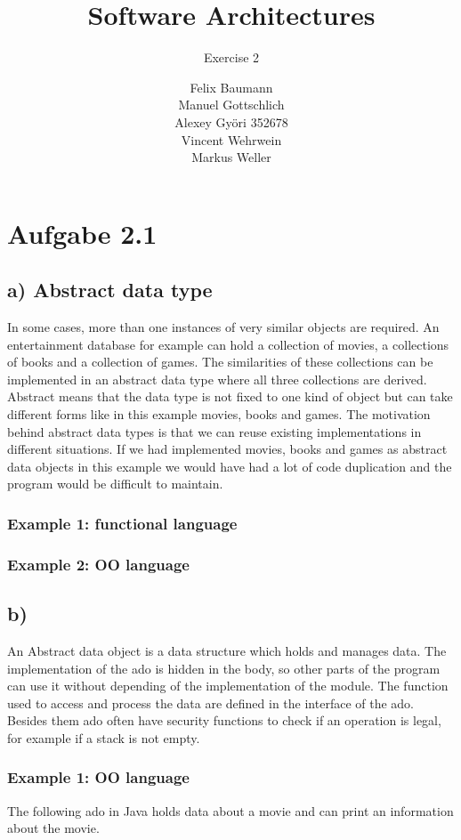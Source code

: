 \documentclass[a4paper,10pt]{scrartcl}[2003/01/01]
\title{Software Architectures}
\subtitle{Exercise 2}
\author{ Felix Baumann \\ Manuel Gottschlich \\  Alexey Gy\"ori 352678 \\ Vincent Wehrwein \\ Markus Weller}
\begin{document}
\maketitle

\section*{Aufgabe 2.1}
\subsection*{a) Abstract data type}
In some cases, more than one instances of very similar objects are required. An  entertainment database for example can hold a collection of movies, a collections of books and a collection of games. The similarities of these collections can be implemented in an abstract data type where all three collections are derived. Abstract means that the data type is not fixed to one kind of object but can take different forms like in this example movies, books and games. The motivation behind abstract data types is that we can reuse existing implementations in different situations. If we had implemented movies, books and games as abstract data objects in this example we would have had a lot of code duplication and the program would be difficult to maintain.

\subsubsection*{Example 1: functional language}


\subsubsection*{Example 2: OO language}



\subsection*{b)}
An Abstract data object is a data structure which holds and manages data. The implementation of the ado is hidden in the body, so other parts of the program can use it without depending of the implementation of the module. The function used to access and process the data are defined in the interface of the ado. Besides them ado often have security functions to check if an operation is legal, for example if a stack is not empty. 

\subsubsection*{Example 1: OO language}
The following ado in Java holds data about a movie and can print an information about the movie. 

\end{document}
